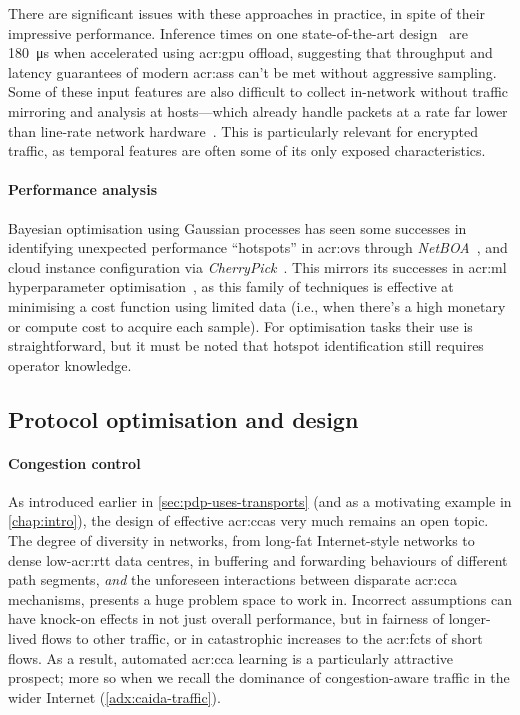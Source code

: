 There are significant issues with these approaches in practice, in spite of their impressive performance.
Inference times on one state-of-the-art design~\parencite{DBLP:conf/sigcomm/Xie0JDSLSX20} are \qty{180}{\micro\second} when accelerated using \gls{acr:gpu} offload, suggesting that throughput and latency guarantees of modern \glspl{acr:as} can't be met without aggressive sampling.
Some of these input features are also difficult to collect in-network without traffic mirroring and analysis at hosts---which already handle packets at a rate far lower than line-rate network hardware~\parencite{DBLP:conf/sigcomm/GuptaHCFRW18}.
This is particularly relevant for encrypted traffic, as temporal features are often some of its only exposed characteristics.

\paragraph{Performance analysis}
Bayesian optimisation using Gaussian processes has seen some successes in identifying unexpected performance ``hotspots'' in \gls{acr:ovs} through \emph{NetBOA}~\parencite{DBLP:conf/sigcomm/ZerwasKHRKB019}, and cloud instance configuration via \emph{CherryPick}~\parencite{DBLP:conf/nsdi/AlipourfardLCVY17}.
This mirrors its successes in \gls{acr:ml} hyperparameter optimisation~\parencite{DBLP:conf/lion/HutterHL11,DBLP:conf/aaai/FeurerSH15}, as this family of techniques is effective at minimising a cost function using limited data (i.e., when there's a high monetary or compute cost to acquire each sample).
For optimisation tasks their use is straightforward, but it must be noted that hotspot identification still requires operator knowledge.

\subsection{Protocol optimisation and design}
\paragraph{Congestion control}
As introduced earlier in \cref{sec:pdp-uses-transports} (and as a motivating example in \cref{chap:intro}), the design of effective \glspl{acr:cca} very much remains an open topic.
The degree of diversity in networks, from long-fat Internet-style networks to dense low-\gls{acr:rtt} data centres, in buffering and forwarding behaviours of different path segments, \emph{and} the unforeseen interactions between disparate \gls{acr:cca} mechanisms, presents a huge problem space to work in.
Incorrect assumptions can have knock-on effects in not just overall performance, but in fairness of longer-lived flows to other traffic, or in catastrophic increases to the \glspl{acr:fct} of short flows.
As a result, automated \gls{acr:cca} learning is a particularly attractive prospect; more so when we recall the dominance of congestion-aware traffic in the wider Internet (\cref{adx:caida-traffic}).

